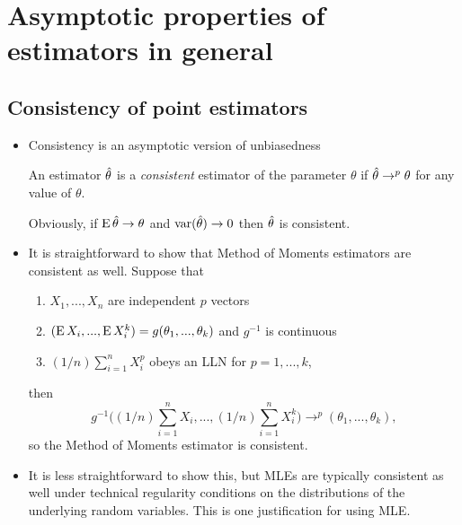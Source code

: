 

\section{Asymptotic properties of estimators in general}

\subsection{Consistency of point estimators}

\begin{itemize}

\item Consistency is an asymptotic version of unbiasedness
  \begin{defn}
    An estimator $\hat{\theta}$ is a \emph{consistent} estimator of the
    parameter $\theta$ if $\hat{\theta} \to^p \theta$ for any value of $\theta$.
  \end{defn}

  Obviously, if $\operatorname{E} \hat{\theta} \to \theta$ and $\operatorname{var}(\hat{\theta}) \to 0$ then $\hat{\theta}$ is
  consistent.

\item It is straightforward to show that Method of Moments estimators
  are consistent as well.  Suppose that
  \begin{enumerate}
  \item $X_1,...,X_n$ are independent $p$ vectors
  \item $(\operatorname{E} X_i,...,\operatorname{E} X_i^k) = g(\theta_1,...,\theta_k)$ and $g^{-1}$ is
    continuous
  \item $(1/n) \sum_{i=1}^n X_i^p$ obeys an LLN for $p = 1,...,k$,
  \end{enumerate}
  then
  \begin{equation*}
    g^{-1}\Big( (1/n) \sum_{i=1}^n X_i,..., (1/n) \sum_{i=1}^n X_i^k \Big)
    \to^p (\theta_1,...,\theta_k),
  \end{equation*}
  so the Method of Moments estimator is consistent.

\item It is less straightforward to show this, but MLEs are typically
  consistent as well under technical regularity conditions on the
  distributions of the underlying random variables.  This is one
  justification for using MLE.

\end{itemize}

